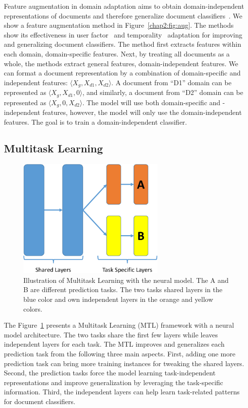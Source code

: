 Feature augmentation in domain adaptation aims to obtain domain-independent representations of documents and therefore generalize document classifiers~\cite{blitzer2006domain, daume2007frustratingly}.
We show a feature augmentation method in Figure~\ref{chap2:fig:aug}.
The methods show its effectiveness in user factor~\cite{lynn2017human} and temporality~\cite{huang2018examining} adaptation for improving and generalizing document classifiers.
The method first extracts features within each domain, domain-specific features.
Next, by treating all documents as a whole, the methods extract general features, domain-independent features.
We can format a document representation by a combination of domain-specific and independent features: $\langle X_g, X_{d1}, X_{d2} \rangle$.
A document from ``D1'' domain can be represented as $\langle X_g, X_{d1}, 0 \rangle$, and similarly, a document from ``D2'' domain can be represented as $\langle X_g, 0, X_{d2} \rangle$. 
The model will use both domain-specific and -independent features, however, the model will only use the domain-independent features.
The goal is to train a domain-independent classifier.


\subsection{Multitask Learning}

\begin{figure}[tb!]
\centering
\includegraphics[width=0.65\textwidth]{images/chapter2/multitask.pdf}
\caption{Illustration of Multitask Learning with the neural model. The A and B are different prediction tasks. The two tasks shared layers in the blue color and own independent layers in the orange and yellow colors.}
\label{chap2:fig:mtl}
\end{figure}

The Figure~\ref{chap2:fig:mtl} presents a Multitask Learning (MTL) framework with a neural model architecture.
The two tasks share the first few layers while leaves independent layers for each task.
The MTL improves and generalizes each prediction task from the following three main aspects.
First, adding one more prediction task can bring more training instances for tweaking the shared layers. 
Second, the prediction tasks force the model learning task-independent representations and improve generalization by leveraging the task-specific information.
Third, the independent layers can help learn task-related patterns for document classifiers.

